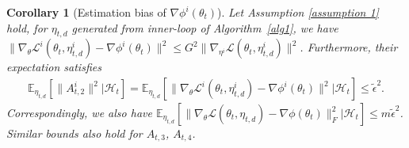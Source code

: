 \documentclass[twoside]{article} %
\theoremstyle{plain}
\newtheorem{corollary}[theorem]{Corollary}
\theoremstyle{definition}
\theoremstyle{remark}
\newcommand{\tepsilon}{\tilde{\epsilon}}
\newcommand{\fL}{\mathcal{L}}
\newcommand{\calH}{\mathcal{H}}
\begin{document}
\begin{corollary}[Estimation bias of $\nabla\phi^i(\theta_t)$]\label{Corollary: estimation bias of inner-loop}
    Let Assumption \ref{assumption 1} hold, for $\eta_{t,d}$ generated from inner-loop of Algorithm~\ref{alg1}, we have     $\|\nabla_{\theta}\fL^i(\theta_t, \eta^i_{t,d}) - \nabla \phi^i(\theta_t) \|^2\leq G^2\|\nabla_{\eta^i}\fL(\theta_t,\eta_{t,d}^i)\|^2$.
    Furthermore, their expectation satisfies
    \begin{align}
        \mathbb{E}_{\eta_{t,d}}[\| A_{t,2}^i\|^2|\calH_t]=\mathbb{E}_{\eta_{t,d}}[\|\nabla_{\theta}\fL^i(\theta_t, \eta^i_{t,d}) - \nabla \phi^i(\theta_t) \|^2|\calH_t]\leq \tepsilon^2.
        \label{eq: approximation error bound }
    \end{align}
    Correspondingly, we also have $ \mathbb{E}_{\eta_{t,d}}[\|\nabla_{\theta}\fL(\theta_t, \eta_{t,d}) - \nabla \phi(\theta_t) \|_F^2|\calH_t]\leq m\tepsilon^2$. Similar bounds also hold for $A_{t,3}$, $A_{t,4}$.
\end{corollary}
\end{document}
